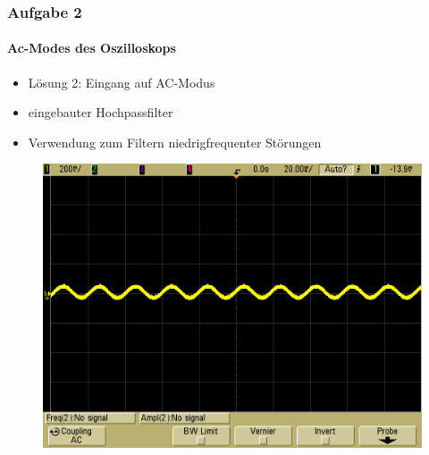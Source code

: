 \begin{frame}
\frametitle{Aufgabe 2}
\framesubtitle{Ac-Modes des Oszilloskops}
\begin{itemize}
    \item Lösung 2: Eingang auf AC-Modus
    \item eingebauter Hochpassfilter 
    \item Verwendung zum Filtern niedrigfrequenter Störungen
\end{itemize}
\begin{figure}[H]
\begin{center}
        \includegraphics[scale=0.2]{./img/2c_Testsignal_AC.png}
\end{center}
\end{figure}

\end{frame}

